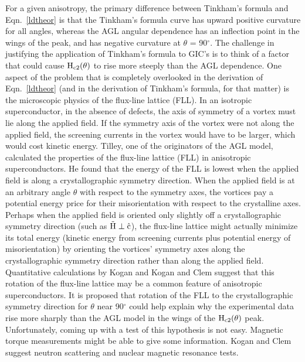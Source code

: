         For a given  anisotropy, the  primary difference  between Tinkham's
formula and  Eqn.~\ref{ldtheor} is that  the  Tinkham's  formula curve  has
upward positive    curvature  for  all  angles,   whereas  the  AGL angular
dependence has an   inflection point in  the  wings of the  peak,  and  has
negative curvature at $\theta$ = 90$^{\circ}$.  The challenge in justifying
the application of Tinkham's formula to GIC's is to think  of a factor that
could  cause $\rm  H_{c2}(\theta)$ to  rise  more  steeply   than  the  AGL
dependence.  One aspect of the problem that is completely overlooked in the
derivation   of  Eqn.~\ref{ldtheor}  (and   in the derivation  of Tinkham's
formula, for  that matter)  is the  microscopic physics  of   the flux-line
lattice (FLL).  In an isotropic superconductor, in the absence  of defects,
the axis of symmetry of a vortex must lie along the applied  field.  If the
symmetry axis of the vortex were not along the applied field, the screening
currents  in the vortex would have  to be larger, which  would cost kinetic
energy.  Tilley,\cite{tilley65} one of  the  originators of the AGL  model,
calculated the  properties of  the flux-line lattice   (FLL) in anisotropic
superconductors.  He found that the energy  of  the FLL is  lowest when the
applied field is  along a crystallographic  symmetry  direction.   When the
applied field is  at an   arbitrary  angle  $\theta$   with respect to  the
symmetry axes,   the vortices  pay  a potential   energy  price  for  their
misorientation with respect to the crystalline axes.\cite{tilley65} Perhaps
when the applied  field is oriented only slightly  off  a  crystallographic
symmetry direction (such as $\rm
\vec{H}
\perp  \hat{c}$), the flux-line  lattice  might actually  minimize its total
energy (kinetic energy  from  screening currents  plus potential energy  of
misorientation)   by orienting the   vortices'  symmetry  axes   along  the
crystallographic symmetry  direction rather than along the   applied field.
Quantitative    calculations by    Kogan\cite{kogan81}    and   Kogan   and
Clem\cite{kogan81a} suggest that this rotation of the flux-line lattice may
be a common feature  of anisotropic superconductors.   It is  proposed that
rotation of the FLL to the crystallographic symmetry direction for $\theta$
near  90$^{\circ}$ could help explain  why the experimental data  rise more
sharply than the AGL model in the wings  of the  $\rm H_{c2}(\theta)$ peak.
Unfortunately,  coming  up with  a   test of this hypothesis is   not easy.
Magnetic     torque    measurements  might   be    able    to   give   some
information.\cite{hagen87}  Kogan  and Clem suggest neutron  scattering and
nuclear magnetic resonance tests.\cite{kogan81a}


